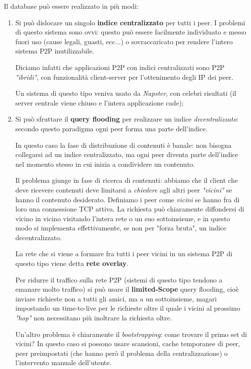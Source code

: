 \documentclass[a4paper,11pt]{article}
\begin{document}
Il database può essere realizzato in più modi:
\begin{enumerate}
	\item Si può dislocare un singolo \textbf{indice centralizzato} per tutti i peer. I problemi di questo sistema sono ovvi: questo può essere facilmente individuato e messo fuori uso (cause legali, guasti, ecc...) o sovraccaricato per rendere l'intero sistema P2P inutilizzabile.

		Diciamo infatti che applicazioni P2P con indici centralizzati sono P2P \textit{"ibridi"}, con funzionalità client-server per l'ottenimento degli IP dei peer.

		Un sistema di questo tipo veniva usato da \textit{Napster}, con celebri risultati (il server centrale viene chiuso e l'intera applicazione cade);

	\item Si può sfruttare il \textbf{query flooding} per realizzare un indice \textit{decentralizzato}: secondo questo paradigma ogni peer forma una parte dell'indice.
	
		In questo caso la fase di distribuzione di contenuti è banale: non bisogna collegarsi ad un indice centralizzato, ma ogni peer diventa parte dell'indice nel momento stesso in cui inizia a condividere un contenuto.

		Il problema giunge in fase di ricerca di contenuti: abbiamo che il client che deve ricevere contenuti deve limitarsi a \textit{chiedere} agli altri peer \textit{"vicini"} se hanno il contenuto desiderato. Definiamo i peer come \textit{vicini} se hanno fra di loro una connessione TCP attiva. 
		La richiesta può chiaramente diffondersi di vicino in vicino visitando l'intera rete o un suo sottoinsieme, e in questo modo si implementa effettivamente, se non per "forza bruta", un indice decentralizzato.

		La rete che si viene a formare fra tutti i peer vicini in un sistema P2P di questo tipo viene detta \textbf{rete overlay}.

		Per ridurre il traffico sulla rete P2P (sistemi di questo tipo tendono a emanare molto traffico) si può usare il \textbf{limited-Scope} query flooding, cioè inviare richieste non a tutti gli amici, ma a un sottoinsieme, magari impostando un time-to-live per le richieste oltre il quale i vicini al prossimo \textit{"hop"} non necessitano più inoltrare la richiesta oltre.

	Un'altro problema è chiaramente il \textit{bootstrapping}: come trovare il primo set di vicini? In questo caso si possono usare scansioni, cache temporanee di peer, peer preimpostati (che hanno però il problema della centralizzazione) o l'intervento manuale dell'utente.


\end{enumerate}
\end{document}
